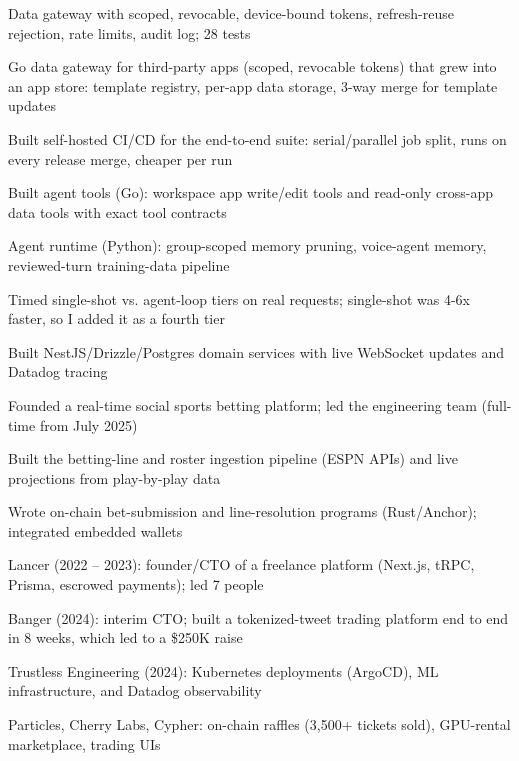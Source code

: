 \documentclass[print]{jack-resume}
\begin{document}
\begin{tightemize}
    \item Data gateway with scoped, revocable, device-bound tokens, refresh-reuse rejection, rate limits, audit log; 28 tests
    \item Go data gateway for third-party apps (scoped, revocable tokens) that grew into an app store: template registry, per-app data storage, 3-way merge for template updates
    \item Built self-hosted CI/CD for the end-to-end suite: serial/parallel job split, runs on every release merge, cheaper per run
    \item Built agent tools (Go): workspace app write/edit tools and read-only cross-app data tools with exact tool contracts
    \item Agent runtime (Python): group-scoped memory pruning, voice-agent memory, reviewed-turn training-data pipeline
    \item Timed single-shot vs. agent-loop tiers on real requests; single-shot was 4-6x faster, so I added it as a fourth tier
\end{tightemize}
\sectionsep

\begin{tightemize}
    \item Built NestJS/Drizzle/Postgres domain services with live WebSocket updates and Datadog tracing
    \item Founded a real-time social sports betting platform; led the engineering team (full-time from July 2025)
    \item Built the betting-line and roster ingestion pipeline (ESPN APIs) and live projections from play-by-play data
    \item Wrote on-chain bet-submission and line-resolution programs (Rust/Anchor); integrated embedded wallets
\end{tightemize}
\sectionsep

\begin{tightemize}
    \item Lancer (2022 – 2023): founder/CTO of a freelance platform (Next.js, tRPC, Prisma, escrowed payments); led 7 people
    \item Banger (2024): interim CTO; built a tokenized-tweet trading platform end to end in 8 weeks, which led to a \$250K raise
    \item Trustless Engineering (2024): Kubernetes deployments (ArgoCD), ML infrastructure, and Datadog observability
    \item Particles, Cherry Labs, Cypher: on-chain raffles (3,500+ tickets sold), GPU-rental marketplace, trading UIs
\end{tightemize}
\sectionsep
\end{document}
